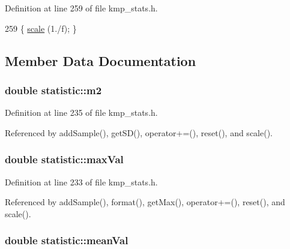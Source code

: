 Definition at line 259 of file kmp\-\_\-stats.\-h.


\begin{DoxyCode}
259 \{ \hyperlink{classstatistic_aee49a269c79947670f53f68e24c7d1c9}{scale} (1./f); \}
\end{DoxyCode}


\subsection{Member Data Documentation}
\hypertarget{classstatistic_aebbd60d54ac69333572267817c6fcdd9}{
\subsubsection[{m2}]{\setlength{\rightskip}{0pt plus 5cm}double statistic\-::m2\hspace{0.3cm}{\ttfamily [private]}}}\label{classstatistic_aebbd60d54ac69333572267817c6fcdd9}


Definition at line 235 of file kmp\-\_\-stats.\-h.



Referenced by add\-Sample(), get\-S\-D(), operator+=(), reset(), and scale().

\hypertarget{classstatistic_a4d776fbd2f21d0900ab76a02b82dd9ff}{
\subsubsection[{max\-Val}]{\setlength{\rightskip}{0pt plus 5cm}double statistic\-::max\-Val\hspace{0.3cm}{\ttfamily [private]}}}\label{classstatistic_a4d776fbd2f21d0900ab76a02b82dd9ff}


Definition at line 233 of file kmp\-\_\-stats.\-h.



Referenced by add\-Sample(), format(), get\-Max(), operator+=(), reset(), and scale().

\hypertarget{classstatistic_ae1bd63c1e77867dd3c995344e377e8ea}{
\subsubsection[{mean\-Val}]{\setlength{\rightskip}{0pt plus 5cm}double statistic\-::mean\-Val\hspace{0.3cm}{\ttfamily [private]}}}\label{classstatistic_ae1bd63c1e77867dd3c995344e377e8ea}


